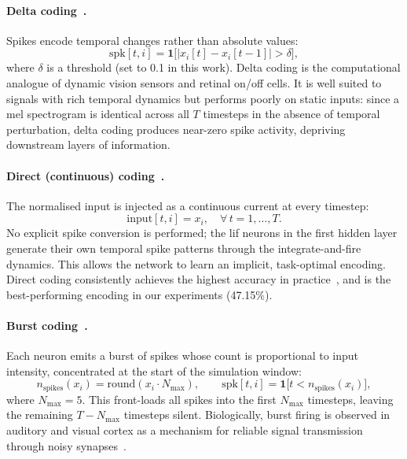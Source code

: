 \paragraph{Delta coding~\citep{lichtsteiner2008}.}
Spikes encode temporal changes rather than absolute values:
\begin{equation}
    \mathrm{spk}[t, i] = \mathbf{1}\bigl[|x_i[t] - x_i[t-1]| > \delta\bigr],
    \label{eq:delta-coding}
\end{equation}
where $\delta$ is a threshold (set to 0.1 in this work). Delta coding is the computational analogue of dynamic vision sensors and retinal on/off cells. It is well suited to signals with rich temporal dynamics but performs poorly on static inputs: since a mel spectrogram is identical across all $T$ timesteps in the absence of temporal perturbation, delta coding produces near-zero spike activity, depriving downstream layers of information.

\paragraph{Direct (continuous) coding~\citep{rathi2021}.}
The normalised input is injected as a continuous current at every timestep:
\begin{equation}
    \mathrm{input}[t, i] = x_i, \quad \forall \, t = 1, \ldots, T.
    \label{eq:direct-coding}
\end{equation}
No explicit spike conversion is performed; the \gls{lif} neurons in the first hidden layer generate their own temporal spike patterns through the integrate-and-fire dynamics. This allows the network to learn an implicit, task-optimal encoding. Direct coding consistently achieves the highest accuracy in practice~\citep{rathi2021,eshraghian2023}, and is the best-performing encoding in our experiments (47.15\%).

\paragraph{Burst coding~\citep{izhikevich2004}.}
Each neuron emits a burst of spikes whose count is proportional to input intensity, concentrated at the start of the simulation window:
\begin{equation}
    n_{\mathrm{spikes}}(x_i) = \mathrm{round}(x_i \cdot N_{\max}), \qquad
    \mathrm{spk}[t, i] = \mathbf{1}\bigl[t < n_{\mathrm{spikes}}(x_i)\bigr],
    \label{eq:burst-coding}
\end{equation}
where $N_{\max} = 5$. This front-loads all spikes into the first $N_{\max}$ timesteps, leaving the remaining $T - N_{\max}$ timesteps silent. Biologically, burst firing is observed in auditory and visual cortex as a mechanism for reliable signal transmission through noisy synapses~\citep{lisman1997}.

